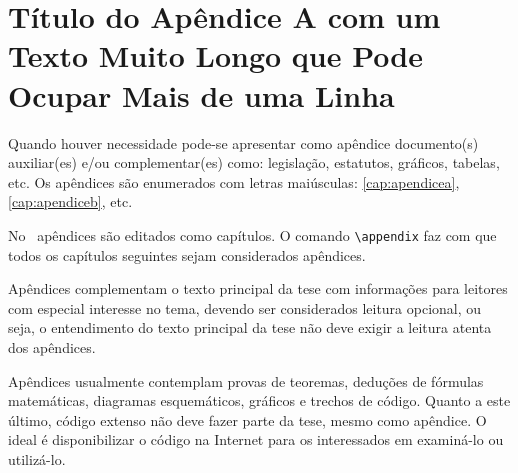 \chapter{Título do Apêndice A com um Texto Muito Longo que Pode Ocupar Mais de uma Linha}\label{cap:apendicea}

Quando houver necessidade pode-se apresentar como apêndice documento(s) auxiliar(es) e/ou complementar(es) como: legislação, estatutos, gráficos, tabelas, etc. Os apêndices são enumerados com letras maiúsculas: \autoref{cap:apendicea}, \autoref{cap:apendiceb}, etc.

No \latex\ apêndices são editados como capítulos. O comando \verb|\appendix| faz com que todos os capítulos seguintes sejam considerados apêndices.

Apêndices complementam o texto principal da tese com informações para leitores com especial interesse no tema, devendo ser considerados leitura opcional, ou seja, o entendimento do texto principal da tese não deve exigir a leitura atenta dos apêndices.

Apêndices usualmente contemplam provas de teoremas, deduções de fórmulas matemáticas, diagramas esquemáticos, gráficos e trechos de código. Quanto a este último, código extenso não deve fazer parte da tese, mesmo como apêndice. O ideal é disponibilizar o código na Internet para os interessados em examiná-lo ou utilizá-lo.
